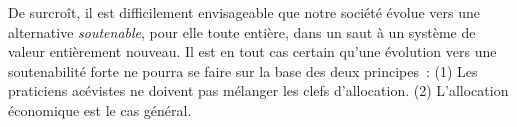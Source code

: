 
De surcroît, il est difficilement envisageable que notre société évolue vers une alternative \emph{soutenable}, pour elle toute entière, dans un saut à un système de valeur entièrement nouveau.
Il est en tout cas certain qu'une évolution vers une soutenabilité forte ne pourra se faire sur la base des deux principes~:
(1) Les praticiens acévistes ne doivent pas mélanger les clefs d'allocation.
(2) L'allocation économique est le cas général.

